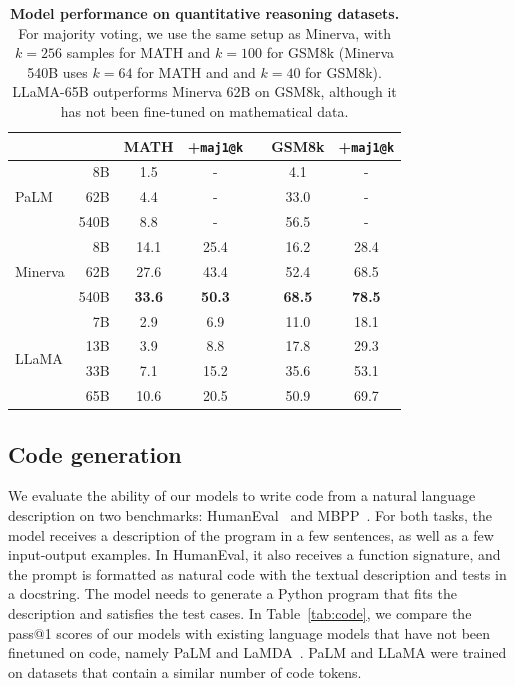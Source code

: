 \documentclass[11pt]{article}
\newcommand{\model}{LLaMA\xspace}
\begin{document}
\begin{table}[h] 
  \center
  \setlength{\tabcolsep}{2pt}
  \begin{tabular}{@{}l@{}r@{} cc c cc@{}}
  \toprule
&       & MATH & \footnotesize{+\texttt{maj1@k}} && GSM8k & \footnotesize{+\texttt{maj1@k}} \\
  \midrule
  \multirow{3}{*}{PaLM}
  	& 8B	& 1.5  & - && 4.1  & - \\
	& 62B	& 4.4  & - && 33.0 & - \\
	& 540B	& 8.8  & - && 56.5 & - \\
 \midrule
 \multirow{3}{*}{Minerva}
        & 8B	& 14.1 & 25.4 && 16.2 & 28.4 \\
	& 62B	& 27.6 & 43.4 && 52.4 & 68.5 \\
	& 540B	& \bf 33.6 & \bf 50.3 && \bf 68.5 & \bf 78.5 \\
\midrule
\multirow{4}{*}{\model}
        & 7B	& 2.9  & 6.9  && 11.0 & 18.1 \\
	& 13B	& 3.9  & 8.8  && 17.8 & 29.3 \\
	& 33B	& 7.1  & 15.2 && 35.6 & 53.1 \\
	& 65B	& 10.6 & 20.5 && 50.9 & 69.7 \\
  \bottomrule
  \end{tabular}
  \caption{
  \textbf{Model performance on quantitative reasoning datasets.} For majority voting, we use the same setup as Minerva, with $k=256$ samples for MATH and $k=100$ for GSM8k (Minerva 540B uses $k=64$ for MATH and and $k=40$ for GSM8k). \model-65B outperforms Minerva 62B on GSM8k, although it has not been fine-tuned on mathematical data.
  \label{tab:math}
  }
\end{table}

\subsection{Code generation}
\label{sec:codegen}
We evaluate the ability of our models to write code from a natural language
description on two benchmarks: HumanEval~\cite{chen2021Evaluating} and MBPP~\cite{austin2021program}.
For both tasks, the model receives a description of the program in a few sentences, as well as a few input-output examples. 
In HumanEval, it also receives a function signature, and the prompt is formatted as natural code with the textual description and tests in a docstring. 
The model needs to generate a Python program that fits the description and satisfies the test cases.
In Table~\ref{tab:code}, we compare the pass@1 scores of our models with existing language models that have not been finetuned on code, namely PaLM and LaMDA~\cite{thoppilan2022lambda}. PaLM and \model were trained on datasets that contain a similar number of code tokens.
\end{document}
